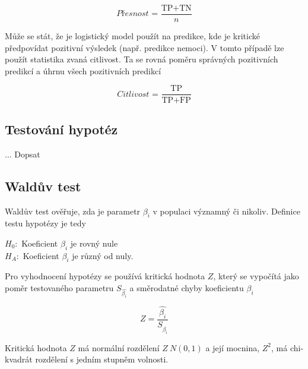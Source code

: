 {\begin{equation}
    \textit{Přesnost = } \frac{\text{TP} + \text{TN}}{n}
\end{equation}

Může se stát, že je logistický model použít na predikce, kde je kritické předpovídat pozitivní výsledek (např. predikce nemoci). V tomto případě lze
použít statistika zvaná citlivost. Ta se rovná poměru správných pozitivních predikcí a úhrnu všech pozitivních predikcí

\begin{equation}
    \textit{Citlivost = } \frac{\text{TP}}{\text{TP} + \text{FP}}
\end{equation}

}

{\color{red}
\subsection{Testování hypotéz}
... Dopsat
}

\subsection{Waldův test}
{\color{red}
Waldův test ověřuje, zda je parametr $\beta_i$ v populaci významný či nikoliv. Definice testu hypotézy je tedy
}

$H_0:$ Koeficient $\beta_i$ je rovný nule \\
$H_A:$ Koeficient $\beta_i$ je různý od nuly.

{\color{red}
Pro vyhodnocení hypotézy se používá kritická hodnota $Z$, který se vypočítá jako poměr testovaného parametru $S_{\hat{\beta_i}}$
a směrodatné chyby koeficientu $\beta_i$


\begin{equation}
    Z = \frac{\hat{\beta_i}}{S_{\hat{\beta_i}}}
\end{equation}

Kritická hodnota $Z$ má normální rozdělení $Z ~ N(0, 1)$ a její mocnina, $Z^2$, má chi-kvadrát rozdělení s jedním stupněm volnosti.
}


